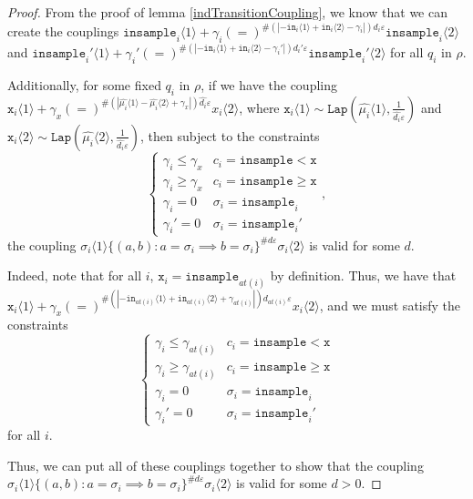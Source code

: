 \documentclass[12pt]{article}
\newcommand{\gguard}[1][x]{\texttt{insample}\geq#1}
\newcommand{\lguard}[1][x]{\texttt{insample} < #1}
\newcommand{\brangle}[1]{\langle#1 \rangle}
\newcommand{\Lap}{\texttt{Lap}}
\theoremstyle{definition}
\begin{document}
\begin{proof}
    From the proof of lemma \ref{indTransitionCoupling}, we know that we can create the couplings $\texttt{insample}_i\brangle{1} +\gamma_i{(=)}^{\#(|-\texttt{in}_i\brangle{1}+\texttt{in}_i\brangle{2}-\gamma_i|)d_i\varepsilon}\texttt{insample}_i\brangle{2}$ and $\texttt{insample}_i'\brangle{1} +\gamma_i'{(=)}^{\#(|-\texttt{in}_i\brangle{1}+\texttt{in}_i\brangle{2}-\gamma_i'|)d_i'\varepsilon}\texttt{insample}_i'\brangle{2}$ for all $q_i$ in $\rho$. 

    Additionally, for some fixed $q_i$ in $\rho$, if we have the coupling $\texttt{x}_i\brangle{1}+\gamma_x (=)^{\#(|\hat{\mu_i}\brangle{1}-\hat{\mu_i}\brangle{2}+\gamma_x|)\hat{d_i}\varepsilon}x_i\brangle{2}$, where $\texttt{x}_i\brangle{1}\sim \Lap(\hat{\mu_i}\brangle{1}, \frac{1}{\hat{d_i}\varepsilon})$ and $\texttt{x}_i\brangle{2}\sim \Lap(\hat{\mu_i}\brangle{2}, \frac{1}{\hat{d_i}\varepsilon})$, then subject to the constraints \[
        \begin{cases}
          \gamma_i\leq\gamma_x & c_i = \lguard[\texttt{x}]\\
          \gamma_i\geq\gamma_x & c_i = \gguard[\texttt{x}]\\
          \gamma_i=0 & \sigma_i = \texttt{insample}_i\\
          \gamma_i'=0 & \sigma_i = \texttt{insample}_i'
        \end{cases},
      \]
    the coupling $\sigma_i\brangle{1}\{(a, b): a=\sigma_i\implies b=\sigma_i\}^{\#d\varepsilon}\sigma_i\brangle{2}$ is valid for some $d$. 

    Indeed, note that for all $i$, $\texttt{x}_i = \texttt{insample}_{at(i)}$ by definition. Thus, we have that $\texttt{x}_i\brangle{1}+\gamma_x (=)^{\#(|-\texttt{in}_{at(i)}\brangle{1}+\texttt{in}_{at(i)}\brangle{2}+\gamma_{at(i)}|)d_{at(i)}\varepsilon}x_i\brangle{2}$, and we must satisfy the constraints \[
        \begin{cases}
          \gamma_i\leq\gamma_{at(i)} & c_i = \lguard[\texttt{x}]\\
          \gamma_i\geq\gamma_{at(i)} & c_i = \gguard[\texttt{x}]\\
          \gamma_i=0 & \sigma_i = \texttt{insample}_i\\
          \gamma_i'=0 & \sigma_i = \texttt{insample}_i'
        \end{cases}
      \]
      for all $i$.

    Thus, we can put all of these couplings together to show that the coupling $\sigma_i\brangle{1}\{(a, b): a=\sigma_i\implies b=\sigma_i\}^{\#d\varepsilon}\sigma_i\brangle{2}$ is valid for some $d>0$.


\end{proof}
\end{document}
